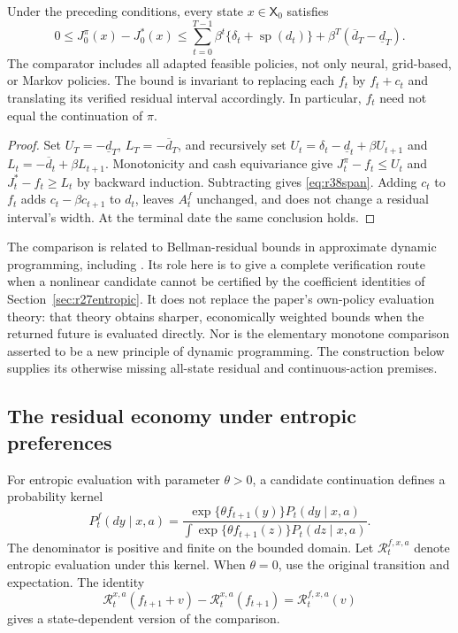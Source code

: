 \begin{theorem}\label{thm:r38span}
Under the preceding conditions, every state $x\in\mathsf X_0$ satisfies
\begin{equation}\label{eq:r38span}
 0\leq J_0^\pi(x)-J_0^*(x)
 \leq\sum_{t=0}^{T-1}\beta^t\{\delta_t+\operatorname{sp}(d_t)\}
       +\beta^T(\overline d_T-\underline d_T).
\end{equation}
The comparator includes all adapted feasible policies, not only neural,
grid-based, or Markov policies. The bound is invariant to replacing each
$f_t$ by $f_t+c_t$ and translating its verified residual interval accordingly.
In particular, $f_t$ need not equal the continuation of $\pi$.
\end{theorem}

\begin{proof}
Set $U_T=-\underline d_T$, $L_T=-\overline d_T$, and recursively set
$U_t=\delta_t-\underline d_t+\beta U_{t+1}$ and
$L_t=-\overline d_t+\beta L_{t+1}$. Monotonicity and cash equivariance give
$J_t^\pi-f_t\leq U_t$ and $J_t^*-f_t\geq L_t$ by backward induction.
Subtracting gives \eqref{eq:r38span}. Adding $c_t$ to $f_t$ adds
$c_t-\beta c_{t+1}$ to $d_t$, leaves $A_t^f$ unchanged, and does not change a
residual interval's width. At the terminal date the same conclusion holds.
\end{proof}

The comparison is related to Bellman-residual bounds in approximate dynamic
programming, including \citet{r38petrik2011}. Its role here is to give a
complete verification route when a nonlinear candidate cannot be certified
by the coefficient identities of Section~\ref{sec:r27entropic}. It does not
replace the paper's own-policy evaluation theory: that theory obtains
sharper, economically weighted bounds when the returned future is evaluated
directly. Nor is the elementary monotone comparison asserted to be a new
principle of dynamic programming. The construction below supplies its
otherwise missing all-state residual and continuous-action premises.

\subsection{The residual economy under entropic preferences}
For entropic evaluation with parameter $\theta>0$, a candidate continuation
defines a probability kernel
\begin{equation}\label{eq:r38tilt}
 P_t^f(dy\mid x,a)=
 \frac{\exp\{\theta f_{t+1}(y)\}P_t(dy\mid x,a)}
 {\int\exp\{\theta f_{t+1}(z)\}P_t(dz\mid x,a)}.
\end{equation}
The denominator is positive and finite on the bounded domain. Let
$\mathcal R_t^{f,x,a}$ denote entropic evaluation under this kernel. When
$\theta=0$, use the original transition and expectation. The identity
\[
 \mathcal R_t^{x,a}(f_{t+1}+v)-\mathcal R_t^{x,a}(f_{t+1})
       =\mathcal R_t^{f,x,a}(v)
\]
gives a state-dependent version of the comparison.

